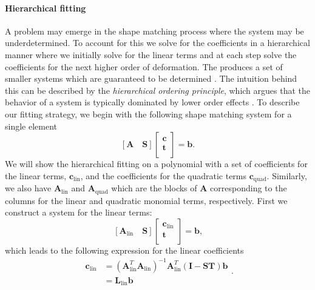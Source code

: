 \paragraph*{Hierarchical fitting}
A problem may emerge in the shape matching process where the system may be underdetermined. To account for this we solve for the coefficients in a hierarchical manner where we initially solve for the linear terms and at each step solve the coefficients for the next higher order of deformation. The produces a set of smaller systems which are guaranteed to be determined . The intuition behind this can be described by the \textit{hierarchical ordering principle}, which argues that the behavior of a system is typically dominated by lower order effects . To describe our fitting strategy, we begin with the following shape matching system for a single element
\begin{equation}
\label{eqn:fitting_one_copy}
\left[
\mathbf{A} \quad \mathbf{S}
\right]
\left[ \begin{array}{c}
\mathbf{c} \\
\mathbf{t} \\
\end{array} \right] = \mathbf{b}
\text{.}
\end{equation}
We will show the hierarchical fitting on a polynomial with a set of coefficients for the linear terms, $\mathbf{c}_{\text{lin}}$, and the coefficients for the quadratic terms $\mathbf{c}_{\text{quad}}$. Similarly, we also have $\mathbf{A}_{\text{lin}}$ and $\mathbf{A}_{\text{quad}}$ which are the blocks of $\mathbf{A}$ corresponding to the columns for the linear and quadratic monomial terms, respectively. First we construct a system for the linear terms:
\begin{equation}
\label{eqn:fitting_linear}
\left[
\mathbf{A}_{\text{lin}} \quad \mathbf{S}
\right]
\left[ \begin{array}{c}
\mathbf{c}_{\text{lin}} \\
\mathbf{t} \\
\end{array} \right] = \mathbf{b}
\text{,}
\end{equation}
which leads to the following expression for the linear coefficients
\begin{equation}
\label{eqn:c_linear}
\begin{split}
\mathbf{c}_{\text{lin}} & = (\mathbf{A}_{\text{lin}}^T\mathbf{A}_{\text{lin}})^{-1}\mathbf{A}_{\text{lin}}^T(\mathbf{I-ST})\mathbf{b} \\
           & = \mathbf{L}_{\text{lin}}\mathbf{b}
\end{split}
\text{.}
\end{equation}

